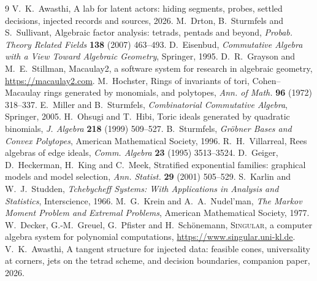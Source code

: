 \documentclass[11pt]{article}
\theoremstyle{definition}\newtheorem{definition}[theorem]{Definition}\newtheorem{remark}[theorem]{Remark}\newtheorem{example}[theorem]{Example}
\begin{document}
\begin{thebibliography}{9}
 V.~K.~Awasthi, A lab for latent actors: hiding segments, probes, settled decisions, injected records and sources, 2026.
 M.~Drton, B.~Sturmfels and S.~Sullivant, Algebraic factor analysis: tetrads, pentads and beyond, \emph{Probab. Theory Related Fields} \textbf{138} (2007) 463--493.
 D.~Eisenbud, \emph{Commutative Algebra with a View Toward Algebraic Geometry}, Springer, 1995.
 D.~R.~Grayson and M.~E.~Stillman, Macaulay2, a software system for research in algebraic geometry, \url{https://macaulay2.com}.
 M.~Hochster, Rings of invariants of tori, Cohen--Macaulay rings generated by monomials, and polytopes, \emph{Ann. of Math.} \textbf{96} (1972) 318--337.
 E.~Miller and B.~Sturmfels, \emph{Combinatorial Commutative Algebra}, Springer, 2005.
 H.~Ohsugi and T.~Hibi, Toric ideals generated by quadratic binomials, \emph{J. Algebra} \textbf{218} (1999) 509--527.
 B.~Sturmfels, \emph{Gröbner Bases and Convex Polytopes}, American Mathematical Society, 1996.
 R.~H.~Villarreal, Rees algebras of edge ideals, \emph{Comm. Algebra} \textbf{23} (1995) 3513--3524.
 D.~Geiger, D.~Heckerman, H.~King and C.~Meek, Stratified exponential families: graphical models and model selection, \emph{Ann. Statist.} \textbf{29} (2001) 505--529.
 S.~Karlin and W.~J.~Studden, \emph{Tchebycheff Systems: With Applications in Analysis and Statistics}, Interscience, 1966.
 M.~G.~Krein and A.~A.~Nudel'man, \emph{The Markov Moment Problem and Extremal Problems}, American Mathematical Society, 1977.
 W.~Decker, G.-M.~Greuel, G.~Pfister and H.~Schönemann, \textsc{Singular}, a computer algebra system for polynomial computations, \url{https://www.singular.uni-kl.de}.
 V.~K.~Awasthi, A tangent structure for injected data: feasible cones, universality at corners, jets on the tetrad scheme, and decision boundaries, companion paper, 2026.
\end{thebibliography}
\end{document}
